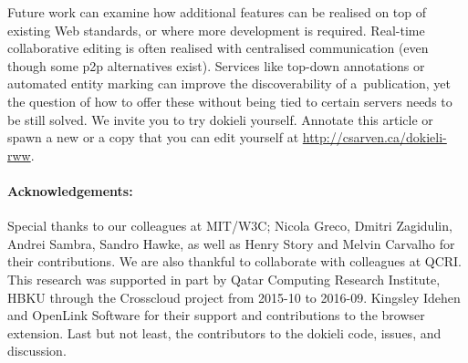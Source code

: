 \documentclass[a4paper]{llncs}
\begin{document}
                            
\par 
                                Future work can examine how
                                additional features can be realised
                                on top of existing Web standards,
                                or where more development is required.
                                Real-time collaborative editing
                                is often realised with centralised communication
                                (even though some p2p alternatives exist).
                                Services like top-down annotations or automated entity marking
                                can improve the discoverability of a publication,
                                yet the question of how to offer these
                                without being tied to certain servers needs to be still solved. We invite you to try dokieli yourself. Annotate this article or spawn a new or a copy that you can edit yourself at \url{http://csarven.ca/dokieli-rww}.

                    
\paragraph{Acknowledgements:}
Special thanks to our colleagues at \empty MIT/\empty W3C; \empty Nicola Greco, \empty Dmitri Zagidulin, \empty Andrei Sambra, \empty Sandro Hawke, as well as \empty Henry Story and \empty Melvin Carvalho for their contributions. We are also thankful to collaborate with colleagues at \empty QCRI. This research was supported in part by \empty Qatar Computing Research Institute, \empty HBKU through the \empty Crosscloud project from 2015-10 to 2016-09. \empty Kingsley Idehen and \empty OpenLink Software for their support and contributions to the browser extension. Last but not least, the contributors to the dokieli code, issues, and discussion.
\end{document}
